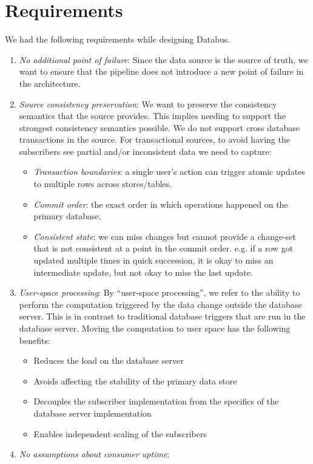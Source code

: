 \section{Requirements}
We had the following requirements while designing Databus.
\begin{enumerate}[I]
\item \emph{No additional point of failure}: 
Since the data source is the source of truth, we want to ensure that the pipeline does not introduce a new point of failure in the architecture. 
\item \emph{Source consistency preservation}: 
We want to preserve the consistency semantics that the source provides. 
This implies needing to support the strongest consistency semantics possible. 
We do not support cross database transactions in the source. 
For transactional sources, to avoid having the subscribers see partial and/or inconsistent data we need to capture:
\begin{itemize}
\item \emph{Transaction boundaries}: a single user's action can trigger atomic updates to multiple rows across stores/tables. 
\item \emph{Commit order}: the exact order in which operations happened on the primary database.
\item \emph{Consistent state}: we can miss changes but cannot provide a change-set that is not consistent at a point in the commit order. e.g. if a row got updated multiple times in quick succession, it is okay to miss an intermediate update, but not okay to miss the last update. 
\end{itemize}
\item \emph{User-space processing}: 
By ``user-space processing'', we refer to the ability to perform the computation triggered by the data change outside the database server. This is in contrast to traditional database triggers that are run in the database server.
Moving the computation to user space has the following benefits:
\begin{itemize}
\item Reduces the load on the database server
\item Avoids affecting the stability of the primary data store
\item Decouples the subscriber implementation from the specifics of the database server implementation
\item Enables independent scaling of the subscribers
\end{itemize}
\item \emph{No assumptions about consumer uptime}: 

\end{enumerate}
